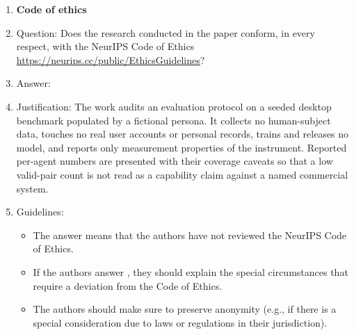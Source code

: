 \begin{enumerate}
\item {\bf Code of ethics}
    \item[] Question: Does the research conducted in the paper conform, in every respect, with the NeurIPS Code of Ethics \url{https://neurips.cc/public/EthicsGuidelines}?
    \item[] Answer: \answerYes{}
    \item[] Justification: The work audits an evaluation protocol on a seeded desktop benchmark populated by a fictional persona. It collects no human-subject data, touches no real user accounts or personal records, trains and releases no model, and reports only measurement properties of the instrument. Reported per-agent numbers are presented with their coverage caveats so that a low valid-pair count is not read as a capability claim against a named commercial system.
    \item[] Guidelines:
    \begin{itemize}
        \item The answer \answerNA{} means that the authors have not reviewed the NeurIPS Code of Ethics.
        \item If the authors answer \answerNo, they should explain the special circumstances that require a deviation from the Code of Ethics.
        \item The authors should make sure to preserve anonymity (e.g., if there is a special consideration due to laws or regulations in their jurisdiction).
    \end{itemize}



\end{enumerate}
